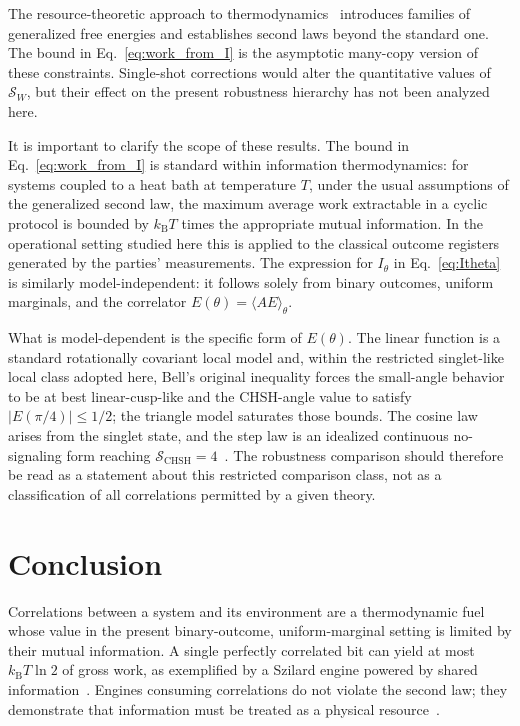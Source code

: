 \documentclass[pra,twocolumn,showpacs,preprintnumbers,amsmath,amssymb,longbibliography,
               superscriptaddress]{revtex4-2}
\begin{document}
{The resource-theoretic approach to
thermodynamics~\cite{Brandao2015,Brandao2015b,Horodecki2013}
introduces families of generalized free energies and establishes
second laws beyond the standard one.
The bound in Eq.~\eqref{eq:work_from_I} is the asymptotic
many-copy version of these constraints.
Single-shot corrections would alter the quantitative values of
$\mathcal{S}_W$, but their effect on the present robustness hierarchy
has not been analyzed here.}

{It is important to clarify the scope of these results.
The bound in Eq.~\eqref{eq:work_from_I} is standard within information
thermodynamics: for systems coupled to a heat bath at temperature $T$,
under the usual assumptions of the generalized second law, the maximum
average work extractable in a cyclic protocol is bounded by
$k_{\mathrm{B}}T$ times the appropriate mutual information.
In the operational setting studied here this is applied to the
classical outcome registers generated by the parties' measurements.
The expression for $I_\theta$ in Eq.~\eqref{eq:Itheta} is similarly
model-independent: it follows solely from binary outcomes, uniform
marginals, and the correlator $E(\theta)=\langle AE\rangle_\theta$.}

{What is model-dependent is the specific form of $E(\theta)$.
The linear function is a standard rotationally covariant local model and,
within the restricted singlet-like local class adopted here, Bell's
original inequality forces the small-angle behavior to be at best
linear-cusp-like and the CHSH-angle value to satisfy
$|E(\pi/4)|\le 1/2$; the triangle model saturates those bounds.
The cosine law arises from the singlet state, and the step law is an
idealized continuous no-signaling form reaching
$\mathcal{S}_{\mathrm{CHSH}}=4$~\cite{svozil-krenn}.
The robustness comparison should therefore be read as a statement about
this restricted comparison class, not as a classification of all
correlations permitted by a given theory.}

\section{{Conclusion}}
\label{sec:conclusion}

Correlations between a system and its environment are a thermodynamic
fuel whose value {in the present binary-outcome,
uniform-marginal setting} is limited by their mutual information.
A single perfectly correlated bit can yield at most
$k_{\mathrm{B}}T\ln 2$ of {gross} work, as exemplified by a Szilard engine
powered by shared information{~\cite{Szilard-1929}}.
Engines consuming correlations do not violate the second law; they
demonstrate that information must be treated as a physical
resource{~\cite{landauer:61,bennett-82}}.
\end{document}
